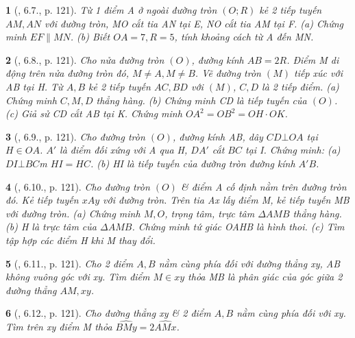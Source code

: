 \documentclass{article}
\newtheorem{baitoan}{}
\begin{document}
\begin{baitoan}[\cite{Binh_boi_duong_Toan_9_tap_1}, 6.7., p. 121]
	Từ 1 điểm A ở ngoài đường tròn $(O;R)$ kẻ 2 tiếp tuyến $AM,AN$ với đường tròn, MO cắt tia AN tại E, NO cắt tia AM tại F. (a) Chứng minh $EF\parallel MN$. (b) Biết $OA = 7,R = 5$, tính khoảng cách từ A đến MN.
\end{baitoan}

\begin{baitoan}[\cite{Binh_boi_duong_Toan_9_tap_1}, 6.8., p. 121]
	Cho nửa đường tròn $(O)$, đường kính $AB = 2R$. Điểm M di động trên nửa đường tròn đó, $M\ne A,M\ne B$. Vẽ đường tròn $(M)$ tiếp xúc với AB tại H. Từ $A,B$ kẻ 2 tiếp tuyến $AC,BD$ với $(M)$, $C,D$ là 2 tiếp điểm. (a) Chứng minh $C,M,D$ thẳng hàng. (b) Chứng minh CD là tiếp tuyến của $(O)$. (c) Giả sử CD cắt AB tại K. Chứng minh $OA^2 = OB^2 = OH\cdot OK$.
\end{baitoan}

\begin{baitoan}[\cite{Binh_boi_duong_Toan_9_tap_1}, 6.9., p. 121]
	Cho đường tròn $(O)$, đường kính AB, dây $CD\bot OA$ tại $H\in OA$. $A'$ là điểm đối xứng với A qua H, $DA'$ cắt $BC$ tại I. Chứng minh: (a) $DI\bot BC$m $HI = HC$. (b) HI là tiếp tuyến của đường tròn đường kính $A'B$.
\end{baitoan}

\begin{baitoan}[\cite{Binh_boi_duong_Toan_9_tap_1}, 6.10., p. 121]
	Cho đường tròn $(O)$ \& điểm A cố định nằm trên đường tròn đó. Kẻ tiếp tuyến $xAy$ với đường tròn. Trên tia Ax lấy điểm M, kẻ tiếp tuyến MB với đường tròn. (a) Chứng minh $M,O$, trọng tâm, trực tâm $\Delta AMB$ thẳng hàng. (b) H là trực tâm của $\Delta AMB$. Chứng minh tứ giác OAHB là hình thoi. (c) Tìm tập hợp các điểm H khi M thay đổi.
\end{baitoan}

\begin{baitoan}[\cite{Binh_boi_duong_Toan_9_tap_1}, 6.11., p. 121]
	Cho 2 điểm $A,B$ nằm cùng phía đối với đường thẳng xy, AB không vuông góc với xy. Tìm điểm $M\in xy$ thỏa MB là phân giác của góc giữa 2 đường thẳng $AM,xy$.
\end{baitoan}

\begin{baitoan}[\cite{Binh_boi_duong_Toan_9_tap_1}, 6.12., p. 121]
	Cho đường thẳng xy \& 2 điểm $A,B$ nằm cùng phía đối với xy. Tìm trên xy điểm M thỏa $\widehat{BMy} = 2\widehat{AMx}$.
\end{baitoan}
\end{document}

